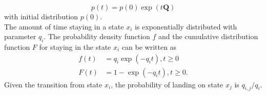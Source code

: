 \begin{equation}
p(t)=p(0) \exp (t\textbf{Q})
\label{eq:ode_sol}
\end{equation}
with initial distribution $ p(0) $.\\
The amount of time staying in a state $ x_{i} $ is exponentially distributed with parameter $ q_{i} $. The probability density function $ f $ and the cumulative distribution function $ F $ for staying in the state $ x_{i} $ can be written as \cite{Nodelman1995}
\begin{align}
f(t) & = q_{i} \exp \left(-q_{i} t\right), t\geq 0  \label{eq:f(t)_homo}\\
F(t) & = 1 - \exp \left(-q_{i} t\right), t\geq 0 .
\end{align}
Given the transition from state $ x_{i} $, the probability of landing on state $ x_{j} $ is $ q_{i,j}/q_{i} $.
